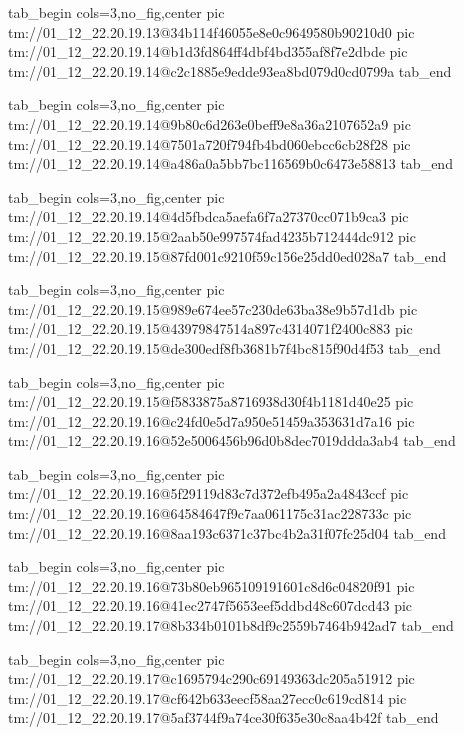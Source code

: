  
 
 
 
 

\qqSecCmtScr


\ifcmt
  tab_begin cols=3,no_fig,center
    pic tm://01_12_22.20.19.13@34b114f46055e8e0c9649580b90210d0
    pic tm://01_12_22.20.19.14@b1d3fd864ff4dbf4bd355af8f7e2dbde
    pic tm://01_12_22.20.19.14@c2c1885e9edde93ea8bd079d0cd0799a
  tab_end
\fi


\ifcmt
  tab_begin cols=3,no_fig,center
    pic tm://01_12_22.20.19.14@9b80c6d263e0beff9e8a36a2107652a9
    pic tm://01_12_22.20.19.14@7501a720f794fb4bd060ebcc6cb28f28
    pic tm://01_12_22.20.19.14@a486a0a5bb7bc116569b0c6473e58813
  tab_end
\fi


\ifcmt
  tab_begin cols=3,no_fig,center
    pic tm://01_12_22.20.19.14@4d5fbdca5aefa6f7a27370cc071b9ca3
    pic tm://01_12_22.20.19.15@2aab50e997574fad4235b712444dc912
    pic tm://01_12_22.20.19.15@87fd001c9210f59c156e25dd0ed028a7
  tab_end
\fi


\ifcmt
  tab_begin cols=3,no_fig,center
    pic tm://01_12_22.20.19.15@989e674ee57c230de63ba38e9b57d1db
    pic tm://01_12_22.20.19.15@43979847514a897c4314071f2400c883
    pic tm://01_12_22.20.19.15@de300edf8fb3681b7f4bc815f90d4f53
  tab_end
\fi


\ifcmt
  tab_begin cols=3,no_fig,center
    pic tm://01_12_22.20.19.15@f5833875a8716938d30f4b1181d40e25
    pic tm://01_12_22.20.19.16@c24fd0e5d7a950e51459a353631d7a16
    pic tm://01_12_22.20.19.16@52e5006456b96d0b8dec7019ddda3ab4
  tab_end
\fi


\ifcmt
  tab_begin cols=3,no_fig,center
    pic tm://01_12_22.20.19.16@5f29119d83c7d372efb495a2a4843ccf
    pic tm://01_12_22.20.19.16@64584647f9c7aa061175c31ac228733c
    pic tm://01_12_22.20.19.16@8aa193c6371c37bc4b2a31f07fc25d04
  tab_end
\fi


\ifcmt
  tab_begin cols=3,no_fig,center
    pic tm://01_12_22.20.19.16@73b80eb965109191601c8d6c04820f91
    pic tm://01_12_22.20.19.16@41ec2747f5653eef5ddbd48c607dcd43
    pic tm://01_12_22.20.19.17@8b334b0101b8df9c2559b7464b942ad7
  tab_end
\fi


\ifcmt
  tab_begin cols=3,no_fig,center
    pic tm://01_12_22.20.19.17@c1695794c290c69149363dc205a51912
    pic tm://01_12_22.20.19.17@cf642b633eecf58aa27ecc0c619cd814
    pic tm://01_12_22.20.19.17@5af3744f9a74ce30f635e30c8aa4b42f
  tab_end
\fi


